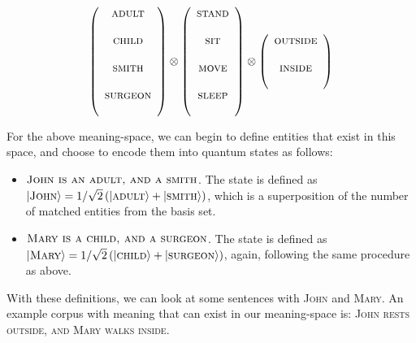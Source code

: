 \begin{equation*}
\left(
\begin{array}{c}
\textsc{adult} \\\\
\textsc{child} \\\\
\textsc{smith} \\\\
\textsc{surgeon} \\\\
\end{array}
\right) \otimes
\left(
\begin{array}{c}
\textsc{stand} \\\\
\textsc{sit} \\\\
\textsc{move} \\\\
\textsc{sleep} \\\\
\end{array}
\right) \otimes
\left(
\begin{array}{c}
\textsc{outside} \\\\
\textsc{inside} \\\\
\end{array}
\right)
\end{equation*}

For the above meaning-space, we can begin to define entities that exist in this space, and choose to encode them into quantum states as follows:
\begin{itemize}
    \item $\textsc{John is an adult, and a smith}$. The state is defined as \\ $\vert \textsc{John} \rangle = 1/\sqrt{2}\left(\vert \textsc{adult} \rangle + \vert \textsc{smith} \rangle\right)$, which is a superposition of the number of matched entities from the basis set.
    \item $\textsc{Mary is a child, and a surgeon}$. The state is defined as \\ $\vert \textsc{Mary} \rangle = 1/\sqrt{2}\left(\vert \textsc{child} \rangle + \vert \textsc{surgeon} \rangle\right)$, again, following the same procedure as above.
\end{itemize}

\noindent With these definitions, we can look at some sentences with \textsc{John} and \textsc{Mary}. An example corpus with meaning that can exist in our meaning-space is:
\textsc{John rests outside, and Mary walks inside}.

